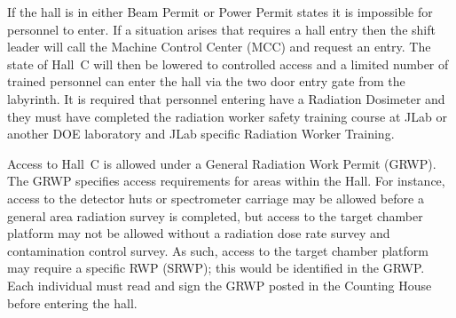If the hall is in either Beam Permit or Power Permit states it is impossible
for personnel to enter. If a situation arises that requires a hall entry
then the shift leader will call the Machine Control Center (MCC) and
request an entry. The state of Hall~C will then be lowered to
controlled access and a limited number of trained personnel can enter
the hall via the two door entry gate from the labyrinth. It
is required that personnel entering have a  Radiation Dosimeter
and they must have completed the radiation worker safety training
course at JLab or another DOE laboratory and JLab specific Radiation Worker
Training.

Access to Hall~C is allowed under a General Radiation Work Permit (GRWP).  The 
GRWP specifies access requirements for areas within the Hall.  For instance, access to the 
detector huts or spectrometer carriage may be allowed before a general area radiation 
survey is completed, but access to the target chamber platform may not be allowed 
without a radiation dose rate survey and contamination control survey.  As such, access to 
the target chamber platform may require a specific RWP (SRWP); this would be identified 
in the GRWP.  Each individual must read and sign the GRWP posted in the Counting 
House before entering the hall.

